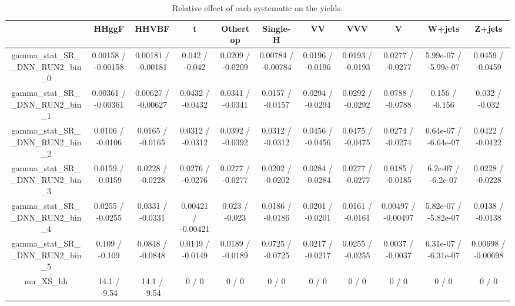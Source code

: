 \documentclass[10pt]{article}
\begin{document}
\begin{table}[htbp]
\begin{center}
\begin{tabular}{|c|c|c|c|c|c|c|c|c|c|c|}
\hline 
      & HHggF      & HHVBF      & t      & Othertop      & Single-H      & VV      & VVV      & V      & W+jets      & Z+jets \\ 
\hline 
  gamma_stat_SR__DNN_RUN2_bin_0 & 0.00158 / -0.00158 & 0.00181 / -0.00181 & 0.042 / -0.042 & 0.0209 / -0.0209 & 0.00784 / -0.00784 & 0.0196 / -0.0196 & 0.0193 / -0.0193 & 0.0277 / -0.0277 & 5.99e-07 / -5.99e-07 & 0.0459 / -0.0459 \\ 
  gamma_stat_SR__DNN_RUN2_bin_1 & 0.00361 / -0.00361 & 0.00627 / -0.00627 & 0.0432 / -0.0432 & 0.0341 / -0.0341 & 0.0157 / -0.0157 & 0.0294 / -0.0294 & 0.0292 / -0.0292 & 0.0788 / -0.0788 & 0.156 / -0.156 & 0.032 / -0.032 \\ 
  gamma_stat_SR__DNN_RUN2_bin_2 & 0.0106 / -0.0106 & 0.0165 / -0.0165 & 0.0312 / -0.0312 & 0.0392 / -0.0392 & 0.0312 / -0.0312 & 0.0456 / -0.0456 & 0.0475 / -0.0475 & 0.0274 / -0.0274 & 6.64e-07 / -6.64e-07 & 0.0422 / -0.0422 \\ 
  gamma_stat_SR__DNN_RUN2_bin_3 & 0.0159 / -0.0159 & 0.0228 / -0.0228 & 0.0276 / -0.0276 & 0.0277 / -0.0277 & 0.0202 / -0.0202 & 0.0284 / -0.0284 & 0.0277 / -0.0277 & 0.0185 / -0.0185 & 6.2e-07 / -6.2e-07 & 0.0228 / -0.0228 \\ 
  gamma_stat_SR__DNN_RUN2_bin_4 & 0.0255 / -0.0255 & 0.0331 / -0.0331 & 0.00421 / -0.00421 & 0.023 / -0.023 & 0.0186 / -0.0186 & 0.0201 / -0.0201 & 0.0161 / -0.0161 & 0.00497 / -0.00497 & 5.82e-07 / -5.82e-07 & 0.0138 / -0.0138 \\ 
  gamma_stat_SR__DNN_RUN2_bin_5 & 0.109 / -0.109 & 0.0848 / -0.0848 & 0.0149 / -0.0149 & 0.0189 / -0.0189 & 0.0725 / -0.0725 & 0.0217 / -0.0217 & 0.0255 / -0.0255 & 0.0037 / -0.0037 & 6.31e-07 / -6.31e-07 & 0.00698 / -0.00698 \\ 
  mu_XS_hh & 14.1 / -9.54 & 14.1 / -9.54 & 0 / 0 & 0 / 0 & 0 / 0 & 0 / 0 & 0 / 0 & 0 / 0 & 0 / 0 & 0 / 0 \\ 
\hline 
\end{tabular} 
\caption{Relative effect of each systematic on the yields.} 
\end{center} 
\end{table} 
\end{document}
